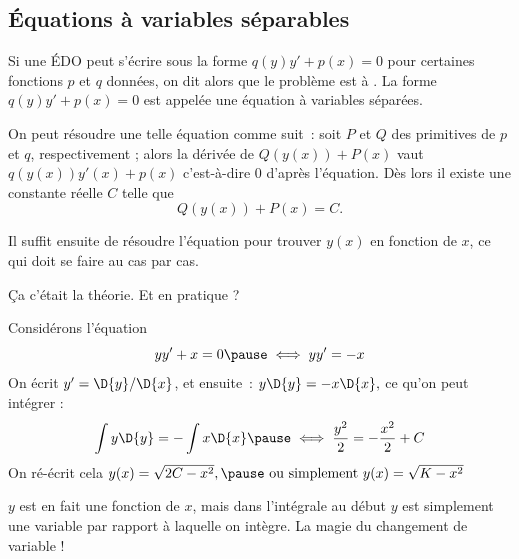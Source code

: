 \subsection{Équations à variables séparables}
\begin{frame}
  Si une ÉDO peut s'écrire sous la forme \(q(y)y' + p(x) = 0\) pour certaines fonctions \(p\) et \(q\) données,\pause{} on dit alors que le problème est à .\pause{} La forme  \(q(y)y' + p(x) = 0\) est appelée une équation à variables séparées.\pause{}

On peut résoudre une telle équation comme suit~:\pause{} soit \(P\) et \(Q\) des primitives de \(p\) et \(q\), respectivement \pause{}; alors la dérivée de \(Q(y(x)) + P(x)\)\pause{} vaut \(q(y(x)) y'(x) + p(x)\)\pause{} c'est-à-dire \(0\) d'après l'équation.\pause{} Dès lors il existe une constante réelle \(C\)\pause{} telle que
\begin{equation*}
  Q(y(x)) + P(x) = C.
\end{equation*}\pause{}

Il \og suffit\fg{} ensuite de résoudre l'équation pour trouver \(y(x)\) en fonction de \(x\),\pause{} ce qui doit se faire au cas par cas.\pause{}

Ça c'était la théorie.\pause{} Et en pratique ?
\end{frame}

\begin{frame}
  \begin{example}
    Considérons l'équation
    \begin{equation*}
      y y' + x = 0\pause \iff yy' = -x
    \end{equation*}\pause On écrit \(y' = \D{y}/\D{x}\),\pause{} et ensuite~:
    \begin{math}
      y \D{y} = -x \D{x},
    \end{math}\pause
    ce qu'on peut intégrer :\pause{}
    \begin{equation*}
      \int y \D{y} = -\int x \D{x} \pause \iff \frac{y^{2}}{2} = - \frac{x^{2}}{2} + C
    \end{equation*}\pause
    On ré-écrit cela
    \begin{math}
      y(x) = \sqrt{2C - x^{2}},\pause\text{ ou simplement } y(x) = \sqrt{K - x^{2}}
    \end{math}\pause{}
  \end{example}
  \begin{remark*}
    \(y\) est en fait une fonction de \(x\), \pause{} mais dans l'intégrale au début\pause{} \(y\) est simplement une variable par rapport à laquelle on intègre.\pause{} La magie du changement de variable !
  \end{remark*}
\end{frame}

